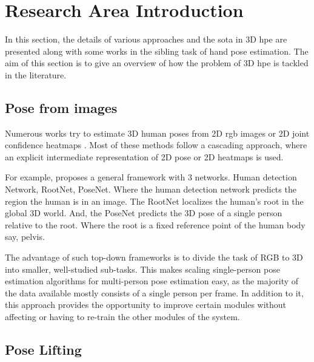 
\section{Research Area Introduction}

\label{sec:Research area introduction}

In this section, the details of various approaches and the \ac{sota} in 3D \ac{hpe} are presented along with some works in the sibling task of hand pose estimation. The aim of this section is to give an overview of how the problem of 3D \ac{hpe} is tackled in the literature.

\subsection{Pose from images}

Numerous works try to estimate 3D human poses from 2D \ac{rgb} images or 2D joint confidence heatmaps \cite{CameraDistanceAware, poselifter, DistillNRSfM, occlusionVideo, ordinalranking}. Most of these methods follow a cascading approach, where an explicit intermediate representation of 2D pose or 2D heatmaps is used.

For example, \cite{CameraDistanceAware} proposes a general framework with 3 networks. Human detection Network, RootNet, PoseNet. Where the human
detection network predicts the region the human is in an image. The RootNet localizes the human's root in the global 3D world. And, the PoseNet
predicts the 3D pose of a single person relative to the root. Where the root is a fixed reference point of the human body say, pelvis.

The advantage of such top-down frameworks is to divide the task of RGB to 3D into smaller, well-studied sub-tasks. This makes scaling single-person
pose estimation algorithms for multi-person pose estimation easy, as the majority of the data available mostly consists of a single person per
frame. In addition to it, this approach provides the opportunity to improve certain modules without affecting or having to re-train the other modules
of the system.

\subsection{Pose Lifting}

